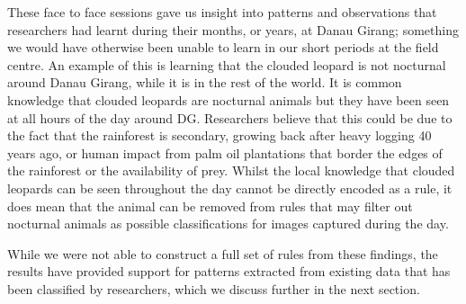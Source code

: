 			These face to face sessions gave us insight into patterns and observations that researchers had learnt during their months, or years, at Danau Girang; something we would have otherwise been unable to learn in our short periods at the field centre. An example of this is learning that the clouded leopard is not nocturnal around Danau Girang, while it is in the rest of the world. It is common knowledge that clouded leopards are nocturnal animals but they have been seen at all hours of the day around DG. Researchers believe that this could be due to the fact that the rainforest is secondary, growing back after heavy logging 40 years ago, or human impact from palm oil plantations that border the edges of the rainforest or the availability of prey. Whilst the local knowledge that clouded leopards can be seen throughout the day cannot be directly encoded as a rule, it does mean that the animal can be removed from rules that may filter out nocturnal animals as possible classifications for images captured during the day.

			While we were not able to construct a full set of rules from these findings, the results have provided support for patterns extracted from existing data that has been classified by researchers, which we discuss further in the next section. 
			
